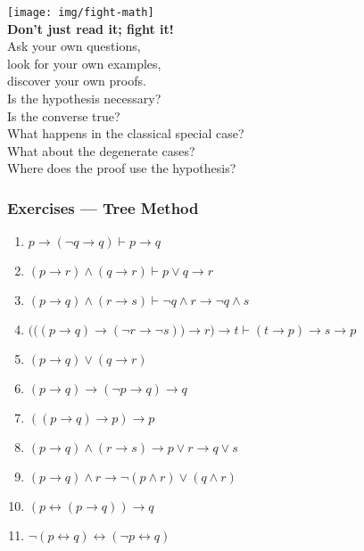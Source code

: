 \documentclass[UTF8,11pt,colorlinks,compress,openany]{beamer}%
\begin{document}
\begin{frame}\frametitle{}
\centering
\texttt{[image: img/fight-math]}\\
\textbf{Don't just read it; fight it!}\\
Ask your own questions,\\
look for your own examples,\\
discover your own proofs.\\
Is the hypothesis necessary?\\
Is the converse true?\\
What happens in the classical special case?\\
What about the degenerate cases?\\
Where does the proof use the hypothesis?
\end{frame}

\begin{frame}\frametitle{Exercises --- Tree Method}
		\begin{enumerate}
			\item $p\to(\neg q\to q)\vdash p\to q$
			\item $(p\to r)\wedge(q\to r)\vdash p\vee q\to r$
			\item $(p\to q)\wedge(r\to s)\vdash\neg q\wedge r\to\neg q\wedge s$
			\item $\Big(\big((p\to q)\to(\neg r\to\neg s)\big)\to r\Big)\to t\vdash (t\to p)\to s\to p$
			\item $(p\to q)\vee(q\to r)$
			\item $(p\to q)\to(\neg p\to q)\to q$
			\item $((p\to q)\to p)\to p$
			\item $(p\to q)\wedge(r\to s)\to p\vee r\to q\vee s$
			\item $(p\to q)\wedge r\to\neg(p\wedge r)\vee(q\wedge r)$
			\item $(p\leftrightarrow(p\to q))\to q$
			\item $\neg(p\leftrightarrow q)\leftrightarrow(\neg p\leftrightarrow q)$
		\end{enumerate}
\end{frame}
\end{document}
